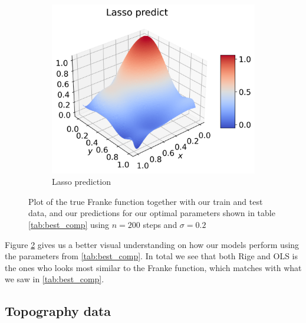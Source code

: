 \documentclass[12pt]{article}
\begin{document}
\begin{figure}[H]
\begin{subfigure}{.5\textwidth}
    \centering
    \includegraphics[width=\textwidth]{../figures/lasso_pred_franke_extra.png}
    \caption{Lasso prediction}
    \label{fig:extra_pred_lasso}
  \end{subfigure}
  \caption{Plot of the true Franke function together with our train and test data, and our predictions for our optimal parameters shown in table \ref{tab:best_comp} using $n=200$ steps and $\sigma=0.2$ }
  \label{fig:extra_pred_franke}
\end{figure}
Figure \ref{fig:extra_pred_franke} gives us a better visual understanding on how our models perform using the parameters from \ref{tab:best_comp}. In total we see that both Rige and OLS is the ones who looks most similar to the Franke function, which matches with what we saw in \ref{tab:best_comp}.

\subsection{Topography data}
\end{document}
